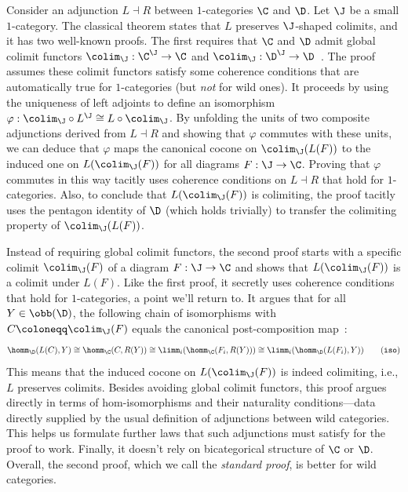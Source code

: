 \documentclass{lmcs}
\theoremstyle{definition}\newtheorem{note}[thm]{Note}
\begin{document}
Consider an adjunction $L \dashv R$ between $1$-categories $\C$ and $\D$. Let $\J$ be a small $1$-category. The classical theorem states that $L$ preserves $\J$-shaped colimits, and it has two well-known proofs. The first requires that $\C$ and $\D$ admit global colimit functors $\colim_{\J} : \C^{\J} \to \C$ and $\colim_{\J} : \D^{\J} \to \D$~\cite[Section V.5]{CTWM}. The proof assumes these colimit functors satisfy some coherence conditions that are automatically true for $1$-categories (but \emph{not} for wild ones). It proceeds by using the uniqueness of left adjoints to define an isomorphism $\varphi : \colim_{\J} \circ L^{\J} \cong  L \circ \colim_{\J}$. By unfolding the units of two composite adjunctions derived from $L \dashv R$ and showing that $\varphi$ commutes with these units, we can deduce that $\varphi$ maps the canonical cocone on $\colim_{\J}(L(F))$ to the induced one on $L(\colim_{\J}(F))$ for all diagrams $F : \J \to \C$. Proving that $\varphi$ commutes in this way tacitly uses coherence conditions on $L \dashv R$ that hold for $1$-categories. Also, to conclude that $L(\colim_{\J}(F))$ is colimiting, the proof tacitly uses the pentagon identity of $\D$ (which holds trivially) to transfer the colimiting property of $\colim_{\J}(L(F))$.

Instead of requiring global colimit functors, the second proof starts with a specific colimit $\colim_{\J}(F)$ of a diagram $F : \J \to \C$ and shows that $L(\colim_{\J}(F))$ is a colimit under $L(F)$. Like the first proof, it secretly uses coherence conditions that hold for $1$-categories, a point we'll return to. It argues that for all $Y \in \obb(\D)$, the following chain of isomorphisms with $C \coloneqq \colim_{\J}(F)$ equals the canonical post-composition map~\cite[Theorem 4.5.2]{CTIC}:
\[ \label{eq:iso}
  \homm_{\D}(L(C), Y) \cong \homm_{\C}(C, R(Y)) \cong \limm_i(\homm_{\C}(F_i, R(Y))) \cong \limm_i(\homm_{\D}(L(F_i), Y))\tag{\texttt{iso}}
\]
This means that the induced cocone on $L(\colim_{\J}(F))$ is indeed colimiting, i.e., $L$ preserves colimits. Besides avoiding global colimit functors, this proof argues directly in terms of hom-isomorphisms and their naturality conditions---data directly supplied by the usual definition of adjunctions between wild categories. This helps us formulate further laws that such adjunctions must satisfy for the proof to work. Finally, it doesn't rely on bicategorical structure of $\C$ or $\D$. Overall, the second proof, which we call the \emph{standard proof}, is better for wild categories.
\end{document}
